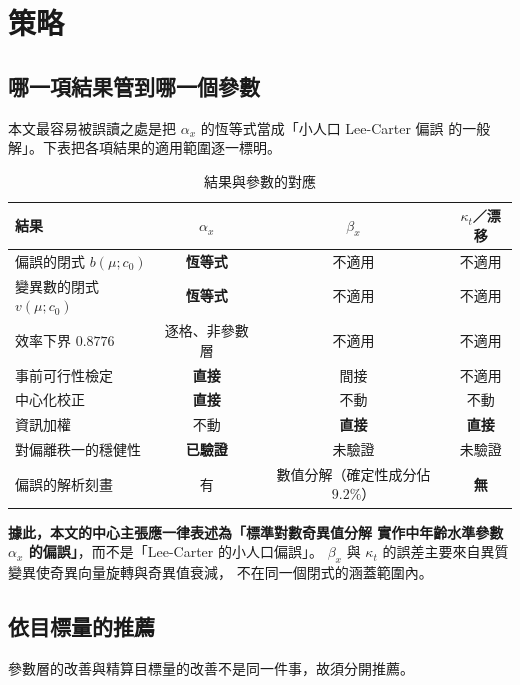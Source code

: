 \documentclass[UTF8, fontset=macnew, a4paper, 12pt]{ctexart}
\begin{document}
\section{策略}\label{s:strat}

\subsection{哪一項結果管到哪一個參數}\label{ss:map}

本文最容易被誤讀之處是把 $\alpha_x$ 的恆等式當成「小人口 Lee-Carter 偏誤
的一般解」。下表把各項結果的適用範圍逐一標明。

\begin{table}[H]
\centering
\caption{結果與參數的對應}
\small
\renewcommand{\arraystretch}{1.15}
\begin{tabular}{p{4.6cm}ccc}
\toprule
結果 & $\alpha_x$ & $\beta_x$ & $\kappa_t$／漂移\\
\midrule
偏誤的閉式 $b(\mu;c_0)$ & \textbf{恆等式} & 不適用 & 不適用\\
變異數的閉式 $v(\mu;c_0)$ & \textbf{恆等式} & 不適用 & 不適用\\
效率下界 $0.8776$ & 逐格、非參數層 & 不適用 & 不適用\\
事前可行性檢定 & \textbf{直接} & 間接 & 不適用\\
中心化校正 & \textbf{直接} & 不動 & 不動\\
資訊加權 & 不動 & \textbf{直接} & \textbf{直接}\\
對偏離秩一的穩健性 & \textbf{已驗證} & 未驗證 & 未驗證\\
偏誤的解析刻畫 & 有 & 數值分解（確定性成分佔 $9.2\%$） & \textbf{無}\\
\bottomrule
\end{tabular}
\label{t:map}
\end{table}

\textbf{據此，本文的中心主張應一律表述為「標準對數奇異值分解
實作中年齡水準參數 $\alpha_x$ 的偏誤」}，而不是「Lee-Carter 的小人口偏誤」。
$\beta_x$ 與 $\kappa_t$ 的誤差主要來自異質變異使奇異向量旋轉與奇異值衰減，
不在同一個閉式的涵蓋範圍內。

\subsection{依目標量的推薦}\label{ss:target}

參數層的改善與精算目標量的改善不是同一件事，故須分開推薦。
\end{document}
